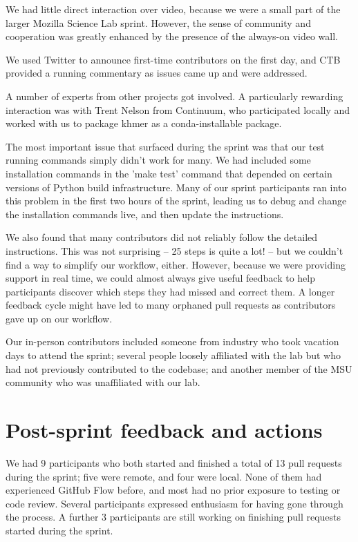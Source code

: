 \documentclass[12pt]{article}
\begin{document}
We had little direct interaction over video, because we were a small part
of the larger Mozilla Science Lab sprint.  However, the sense of community
and cooperation was greatly enhanced by the presence of the always-on
video wall.

We used Twitter to announce first-time contributors on the first day, and
CTB provided a running commentary as issues came up and were addressed.

A number of experts from other projects got involved.  A particularly
rewarding interaction was with Trent Nelson from Continuum, who participated
locally and worked with us to package khmer as a conda-installable package.

The most important issue that surfaced during the sprint was that our
test running commands simply didn't work for many.  We had included
some installation commands in the 'make test' command that depended on
certain versions of Python build infrastructure.  Many of our sprint
participants ran into this problem in the first two hours of the
sprint, leading us to debug and change the installation commands live,
and then update the instructions.

We also found that many contributors did not reliably follow the
detailed instructions.  This was not surprising -- 25 steps is quite a
lot! -- but we couldn't find a way to simplify our workflow, either.
However, because we were providing support in real time, we could
almost always give useful feedback to help participants discover which
steps they had missed and correct them.  A longer feedback cycle might
have led to many orphaned pull requests as contributors gave up on our
workflow.

Our in-person contributors included someone from industry who took
vacation days to attend the sprint; several people loosely affiliated
with the lab but who had not previously contributed to the codebase;
and another member of the MSU community who was unaffiliated with
our lab.

\section{Post-sprint feedback and actions}

We had 9 participants who both started and finished a total of 13 pull
requests during the sprint; five were remote, and four were
local. None of them had experienced GitHub Flow before, and most had
no prior exposure to testing or code review.  Several participants
expressed enthusiasm for having gone through the process.
A further 3 participants are still working on finishing pull requests
started during the sprint.
\end{document}
